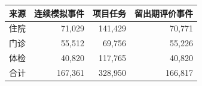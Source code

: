 \begin{tabular}{lrrr}
\toprule
来源 & 连续模拟事件 & 项目任务 & 留出期评价事件 \\
\midrule
住院 & 71,029 & 141,429 & 70,771 \\
门诊 & 55,512 & 69,756 & 55,226 \\
体检 & 40,820 & 117,765 & 40,820 \\
\midrule
合计 & 167,361 & 328,950 & 166,817 \\
\bottomrule
\end{tabular}
